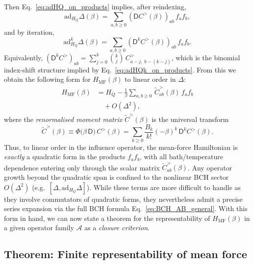Then Eq.~\eqref{eq:adHQ_on_products} implies, after reindexing,
\begin{equation}
    \label{eq:adHQ_Delta_as_D_on_C}
    \mathrm{ad}_{H_Q}\Delta(\beta)
    =\sum_{a,b\ge0}(\mathsf D C^{>}(\beta))_{ab}\, f_a f_b,
\end{equation}
and by iteration,
\begin{equation}
    \label{eq:adHQk_Delta_as_Dk_on_C}
    \mathrm{ad}_{H_Q}^{k}\Delta(\beta)
    =\sum_{a,b\ge0}(\mathsf D^{k} C^{>}(\beta))_{ab}\, f_a f_b.
\end{equation}
Equivalently, $(\mathsf D^{k}C^{>})_{ab}=\sum_{j=0}^{k}\binom{k}{j}\,C^{>}_{a-j,\;b-(k-j)}$, which is the binomial
index-shift structure implied by Eq.~\eqref{eq:adHQk_on_products}. From this we obtain the following form for $H_{\mathrm{MF}}(\beta)$ to linear order in $\Delta$:
\begin{equation}
    \begin{split}
        H_{\mathrm{MF}}(\beta) &= H_Q-\frac{1}{\beta}\sum_{a,b\ge0}\,\widetilde C^{>}_{ab}(\beta)\, f_a f_b \\
        &\quad + O(\Delta^2),
    \end{split}
    \label{eq:HMF_linear_quadratic_final}
\end{equation}
where the \emph{renormalised moment matrix} $\widetilde C^{>}(\beta)$ is the universal transform
\begin{equation}
    \label{eq:Ctilde_def}
    \widetilde C^{>}(\beta) \equiv \Phi\!\big(\beta\,\mathsf D\big)\,C^{>}(\beta)
    = \sum_{k\ge0}\frac{B_k}{k!}(-\beta)^k\,\mathsf D^{k}C^{>}(\beta).
\end{equation}
Thus, to linear order in the influence operator, the mean-force Hamiltonian is \emph{exactly} a quadratic
form in the products $f_af_b$, with all bath/temperature dependence entering only through the scalar matrix
$\widetilde C^{>}_{ab}(\beta)$.
 Any operator growth beyond the quadratic span is confined to the nonlinear BCH sector $O(\Delta^2)$ (e.g.\
$[\Delta,\mathrm{ad}_{H_Q}\Delta]$). While these terms are more difficult to handle as they involve commutators of quadratic forms, they nevertheless admit a precise series expansion via the full BCH formula Eq.~\eqref{eq:BCH_AB_general}. With this form in hand, we can now state a theorem for the representability of $H_{\mathrm{MF}}(\beta)$ in a given operator family $\mathcal A$ as a \emph{closure criterion}.

\subsection{Theorem: Finite representability of mean force}


